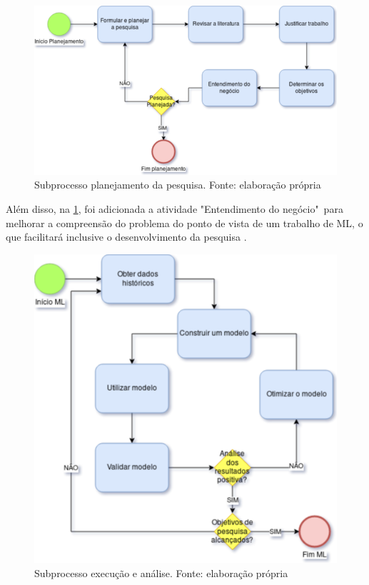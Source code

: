\begin{figure}[h]
	\centering
    \includegraphics[keepaspectratio=true,scale=0.5]{figuras/subprocessoPlanejamento}
	\caption[Subprocesso planejamento da pesquisa]{Subprocesso planejamento da pesquisa. Fonte: elaboração própria}
	\label{fig:subprocessoPlanejamento}
\end{figure}

Além disso, na \ref{fig:subprocessoPlanejamento}, foi adicionada a atividade "Entendimento do negócio"\ para melhorar a compreensão do problema do ponto de vista de um trabalho de ML, o que facilitará inclusive o desenvolvimento da pesquisa \cite{CROWSTON2017}.

\begin{figure}[h]
	\centering
    \includegraphics[keepaspectratio=true,scale=0.5]{figuras/subprocessoAnalise}
	\caption[Subprocesso execução e análise]{Subprocesso execução e análise. Fonte: elaboração própria}
	\label{fig:subprocessoAnalise}
\end{figure}

